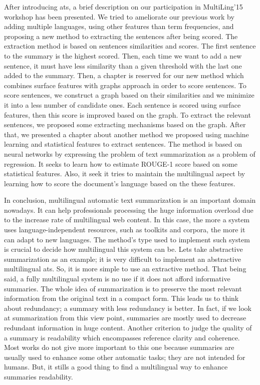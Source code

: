After introducing \ac{ats}, a brief description on our participation in MultiLing'15 workshop has been presented. 
We tried to ameliorate our previous work \citep{15-aries-al} by adding multiple languages, using other features than term frequencies, and proposing a new method to extracting the sentences after being scored. 
The extraction method is based on sentences similarities and scores. 
The first sentence to the summary is the highest scored. 
Then, each time we want to add a new sentence, it must have less similarity than a given threshold with the last one added to the summary. 
Then, a chapter is reserved for our new method which combines surface features with graphs approach in order to score sentences. 
To score sentences, we construct a graph based on their similarities and we minimize it into a less number of candidate ones. 
Each sentence is scored using surface features, then this score is improved based on the graph. 
To extract the relevant sentences, we proposed some extracting mechanisms based on the graph. 
After that, we presented a chapter about another method we proposed using machine learning and statistical features to extract sentences. 
The method is based on neural networks by expressing the problem of text summarization as a problem of regression.
It seeks to learn how to estimate ROUGE-1 score based on some statistical features.
Also, it seek it tries to maintain the multilingual aspect by learning how to score the document's language based on the these features.

In conclusion, multilingual automatic text summarization is an important domain nowadays.
It can help professionals processing the huge information overload due to the increase rate of multilingual web content.
In this case, the more a system uses language-independent resources, such as toolkits and corpora, the more it can adapt to new languages. 
The method's type used to implement such system is crucial to decide how multilingual this system can be. 
Lets take abstractive summarization as an example; it is very difficult to implement an abstractive multilingual \ac{ats}. 
So, it is more simple to use an extractive method.
That being said, a fully multilingual system is no use if it does not afford informative summaries.
The whole idea of summarization is to preserve the most relevant information from the original text in a compact form.
This leads us to think about redundancy; a summary with less redundancy is better. 
In fact, if we look at summarization from this view point, summaries are mostly used to decrease redundant information in huge content.
Another criterion to judge the quality of a summary is readability which encompasses reference clarity and coherence. 
Most works do not give more important to this one because summaries are usually used to enhance some other automatic tasks; they are not intended for humans. 
But, it stills a good thing to find a multilingual way to enhance summaries readability.



